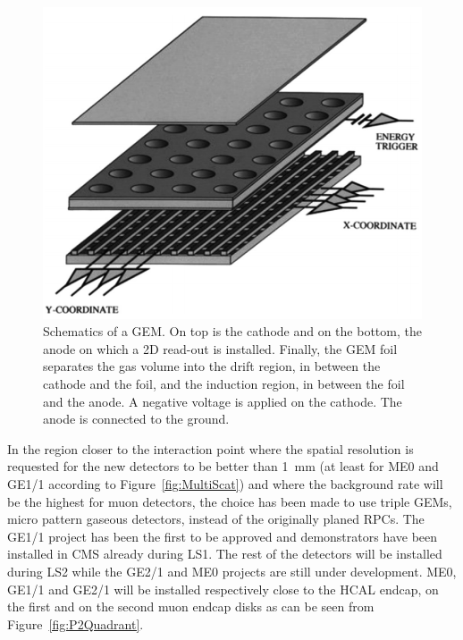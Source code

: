 \begingroup\setlength{\intextsep}{5pt}\setlength{\columnsep}{15pt}

	\begin{figure}
		\vspace{-5mm}
		\centering
		\includegraphics[width=0.9\linewidth]{fig/chapt3/GEM.png}
		\caption{\label{fig:GEM} Schematics of a GEM. On top is the cathode and on the bottom, the anode on which a 2D read-out is installed. Finally, the GEM foil separates the gas volume into the drift region, in between the cathode and the foil, and the induction region, in between the foil and the anode. A negative voltage is applied on the cathode. The anode is connected to the ground.}
	\end{figure}
	
	In the region closer to the interaction point where the spatial resolution is requested for the new detectors to be better than \SI{1}{mm} (at least for ME0 and GE1/1 according to Figure~\ref{fig:MultiScat}) and where the background rate will be the highest for muon detectors, the choice has been made to use triple GEMs, micro pattern gaseous detectors, instead of the originally planed RPCs. The GE1/1 project has been the first to be approved and demonstrators have been installed in CMS already during LS1. The rest of the detectors will be installed during LS2 while the GE2/1 and ME0 projects are still under development. ME0, GE1/1 and GE2/1 will be installed respectively close to the HCAL endcap, on the first and on the second muon endcap disks as can be seen from Figure~\ref{fig:P2Quadrant}.
	
\endgroup


